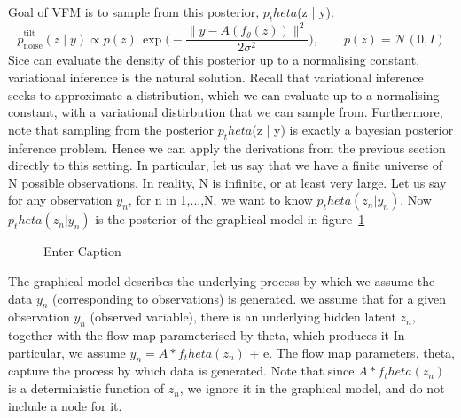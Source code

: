 \documentclass[12pt,a4paper]{report}
\begin{document}
Goal of VFM is to sample from this posterior, $p_theta$(z | y).
\begin{equation}
\label{eq:normalising_constant}
    \widetilde p^{\text{tilt}}_{\text{noise}}(z \mid y) \propto p(z)\,\exp\!\Big(-\frac{\|y - A(f_\theta(z))\|^2}{2\sigma^2}\Big), \qquad p(z) = \mathcal{N}(0,I)
\end{equation}
Sice can evaluate the density of this posterior up to a normalising constant, variational inference is the natural solution. Recall that variational inference seeks to approximate a distribution, which we can evaluate up to a normalising constant, with a variational distirbution that we can sample from. 
Furthermore, note that sampling from the posterior $p_theta$(z | y) is exactly a bayesian posterior inference problem. Hence we can apply the derivations from the previous section directly to this setting. 
In particular, let us say that we have a finite universe of N possible observations. In reality, N is infinite, or at least very large. Let us say for any observation $y_n$, for n in 1,...,N, we want to know $p_theta(z_n | y_n)$.
Now $p_theta(z_n| y_n)$ is the posterior of the graphical model in figure~\ref{fig:graphical_model_simple_VFM}

\begin{figure}[H]
    \centering
    \caption{Enter Caption}
    \label{fig:graphical_model_simple_VFM}
\end{figure}
The graphical model describes the underlying process by which we assume the data $y_n$ (corresponding to observations) is generated. 
we assume that for a given observation $y_n$ (observed variable), there is an underlying hidden latent $z_n$, together with the flow map parameterised by theta, which produces it 
In particular, we assume $y_n = A*f_theta(z_n)$ + e. 
The flow map parameters, theta, capture the process by which data is generated. 
Note that since $A*f_theta(z_n)$ is a deterministic function of $z_n$, we ignore it in the graphical model, and do not include a node for it. 
\end{document}
